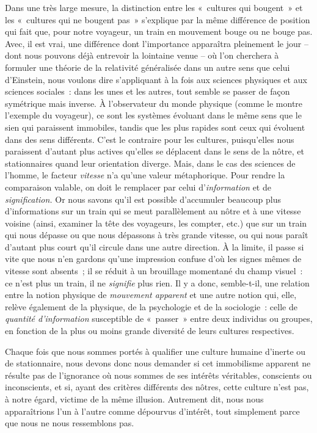 \documentclass[french,twoside]{book} %
\begin{document}
Dans une très large mesure, la distinction entre les « cultures qui bougent » et les « cultures qui ne bougent pas » s’explique par la même différence de position qui fait que, pour notre voyageur, un train en mouvement bouge ou ne bouge pas. Avec, il est vrai, une différence dont l’importance apparaîtra pleinement le jour – dont nous pouvons déjà entrevoir la lointaine venue – où l’on cherchera à formuler une théorie de la relativité généralisée dans un autre sens que celui d’Einstein, nous voulons dire s’appliquant à la fois aux sciences physiques et aux sciences sociales : dans les unes et les autres, tout semble se passer de façon symétrique mais inverse. À l’observateur du monde physique (comme le montre l’exemple du voyageur), ce sont les systèmes évoluant dans le même sens que le sien qui paraissent immobiles, tandis que les plus rapides sont ceux qui évoluent dans des sens différents. C’est le contraire pour les cultures, puisqu’elles nous paraissent d’autant plus actives qu’elles se déplacent dans le sens de la nôtre, et stationnaires quand leur orientation diverge. Mais, dans le cas des sciences de l’homme, le facteur \emph{vitesse} n’a qu’une valeur métaphorique. Pour rendre la comparaison valable, on doit le remplacer par celui d’\emph{information} et de \emph{signification.} Or nous savons qu’il est possible d’accumuler beaucoup plus d’informations sur un train qui se meut parallèlement au nôtre et à une vitesse voisine (ainsi, examiner la tête des voyageurs, les compter, etc.) que sur un train qui nous dépasse ou que nous dépassons à très grande vitesse, ou qui nous paraît d’autant plus court qu’il circule dans une autre direction. À la limite, il passe si vite que nous n’en gardons qu’une impression confuse d’où les signes mêmes de vitesse sont absents ; il se réduit à un brouillage momentané du champ visuel : ce n’est plus un train, il ne \emph{signifie} plus rien. Il y a donc, semble-t-il, une relation entre la notion physique de \emph{mouvement apparent} et une autre notion qui, elle, relève également de la physique, de la psychologie et de la sociologie : celle de \emph{quantité d’information} susceptible de « passer » entre deux individus ou groupes, en fonction de la plus ou moins grande diversité de leurs cultures respectives.\par
Chaque fois que nous sommes portés à qualifier une culture humaine d’inerte ou de stationnaire, nous devons donc nous demander si cet immobilisme apparent ne résulte pas de l’ignorance où nous sommes de ses intérêts véritables, conscients ou inconscients, et si, ayant des critères différents des nôtres, cette culture n’est pas, à notre égard, victime de la même illusion. Autrement dit, nous nous apparaîtrions l’un à l’autre comme dépourvus d’intérêt, tout simplement parce que nous ne nous ressemblons pas.\par
\end{document}
